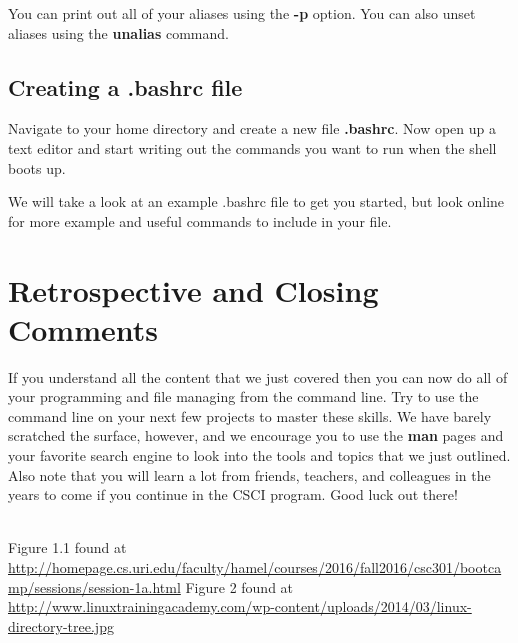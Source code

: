 \documentclass[oneside]{book}
\begin{document}
You can print out all of your aliases using the \textbf{-p} option. You can also unset aliases using the \textbf{unalias} command. 

\subsection{Creating a .bashrc file}
Navigate to your home directory and create a new file \textbf{.bashrc}. Now open up a text editor and start writing out the commands you want to run when the shell boots up.

We will take a look at an example .bashrc file to get you started, but look online for more example and useful commands to include in your file.

\newpage

\section{Retrospective and Closing Comments}
    If you understand all the content that we just covered then you can now do all of your programming and file managing from the command line. Try to use the command line on your next few projects to master these skills. We have barely scratched the surface, however, and we encourage you to use the \textbf{man} pages and your favorite search engine to look into the tools and topics that we just outlined. Also note that you will learn a lot from friends, teachers, and colleagues in the years to come if you continue in the CSCI program. Good luck out there!
    \\
    \\

\newpage
\begin{thebibliography}{10}
	 Figure 1.1 found at \url{http://homepage.cs.uri.edu/faculty/hamel/courses/2016/fall2016/csc301/bootcamp/sessions/session-1a.html}
	 Figure 2 found at \url{http://www.linuxtrainingacademy.com/wp-content/uploads/2014/03/linux-directory-tree.jpg}
\end{thebibliography}
\end{document}
